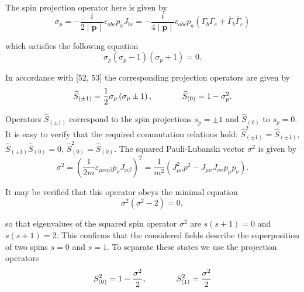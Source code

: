 \documentclass[a4paper,12pt]{article}
\begin{document}
The spin projection operator here is given by
\begin{equation}
\sigma _p=-\frac i{2\mid \mathbf{p}\mid }\epsilon
_{abc}p_aJ_{bc}=-\frac i{4\mid \mathbf{p}\mid }\epsilon
_{abc}p_a\left( \Gamma _b\Gamma _c+ \overline{\Gamma
}_b\overline{\Gamma }_c\right)  \label{26}
\end{equation}

which satisfies the following equation
\begin{equation}
\sigma _p\left( \sigma _p-1\right) \left( \sigma _p+1\right) =0 .
\label{27}
\end{equation}

In accordance with [52, 53] the corresponding projection operators
are given by
\begin{equation}
\widehat{S}_{(\pm 1)}=\frac 12\sigma _p\left( \sigma _p\pm
1\right) ,\hspace{0.5in}\widehat{S}_{(0)}=1-\sigma _p^2
.\label{28}
\end{equation}

Operators $\widehat{S}_{(\pm 1)}$ correspond to the spin
projections $s_p=\pm 1$ and $ \widehat{S}_{(0)}$ to $s_p=0$. It is
easy to verify that the required commutation relations hold:
$\widehat{S}_{(\pm 1)}^2=\widehat{S}_{(\pm 1)}$, $\widehat{S}
_{(\pm 1)}\widehat{S}_{(0)}=0$,
$\widehat{S}_{(0)}^2=\widehat{S}_{(0)}$. The squared
Pauli-Lubanski vector $\sigma ^2$ is given by
\begin{equation}
\sigma ^2=\left( \frac 1{2m}\varepsilon _{\mu \nu \alpha \beta
}p_\nu J_{\alpha \beta }\right) ^2=\frac 1{m^2}\left( J_{\mu \nu
}^2p^2-J_{\mu \sigma }J_{\nu \sigma }p_\mu p_\nu \right) .
\label{29}
\end{equation}

It may be verified that this operator obeys the minimal equation
\begin{equation}
\sigma ^2\left( \sigma ^2-2\right) =0 , \label{30}
\end{equation}

so that eigenvalues of the squared spin operator $\sigma ^2$ are $s(s+1)=0$
and $s(s+1)=2$. This confirms that the considered fields describe the
superposition of two spins $s=0$ and $s=1$. To separate these states we use
the projection operators
\begin{equation}
S_{(0)}^2=1-\frac{\sigma ^2}2
,\hspace{0.5in}S_{(1)}^2=\frac{\sigma ^2}2 \label{31}
\end{equation}
\end{document}
